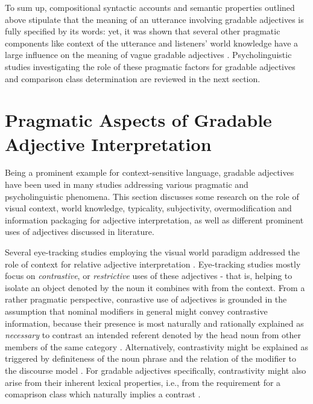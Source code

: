 To sum up, compositional syntactic accounts and semantic properties outlined above stipulate that the meaning of an utterance involving gradable adjectives is fully specified by its words: yet, it was shown that several other pragmatic components like context of the utterance and listeners’ world knowledge have a large influence on the meaning of vague gradable adjectives \parencite[e.g.,][]{tessler2017warm, Kennedy2007, sedivy1999}. Psycholinguistic studies investigating the role of these pragmatic factors for gradable adjectives and comparison class determination are reviewed in the next section. 

\section{Pragmatic Aspects of Gradable Adjective Interpretation}
\label{2.4.}
Being a prominent example for context-sensitive language, gradable adjectives have been used in many studies addressing various pragmatic and psycholinguistic phenomena. This section discusses some research on the role of visual context, world knowledge, typicality, subjectivity, overmodification and information packaging for adjective interpretation, as well as different prominent uses of adjectives discussed in literature. %

Several eye-tracking studies employing the  visual world paradigm addressed the role of context for relative adjective interpretation \parencite[e.g.,][]{sedivy1999, Aparicio2016}.
Eye-tracking studies mostly focus on \textit{contrastive}, or \textit{restrictive} uses of these adjectives - that is, helping to isolate an object denoted by the noun it combines with from the context. From a rather pragmatic perspective, conrastive use of adjectives is grounded in the assumption that nominal modifiers in general might convey contrastive information, because their presence is most naturally and rationally explained as \emph{necessary} to contrast an intended referent denoted by the head noun from other members of the same category \parencite{sedivy1999, clifton1989ambiguity}. Alternatively, contrastivity might be explained as triggered by definiteness of the noun phrase and the relation of the modifier to the discourse model \parencite{sedivy1999, steedman1989ambiguity}. For gradable adjectives specifically, contrastivity might also arise from their inherent lexical properties, i.e., from the requirement for a comaprison class which naturally implies a contrast \parencite{Bierwisch1989, sedivy1999}. 

